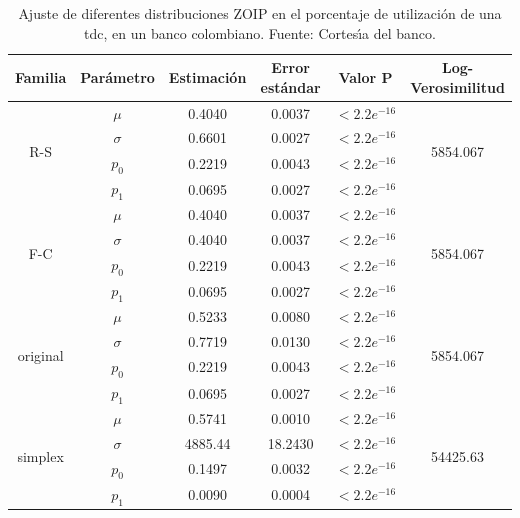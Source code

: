 \begin{table}[!hbt]
{\scriptsize
\begin{center}
\begin{tabular}{|c|c|ccc|c|}\hline
Familia & Par\'{a}metro & Estimaci\'{o}n & Error est\'{a}ndar & Valor P & Log-Verosimilitud\\ \hline

\multirow{4}{*}{R-S} &$\mu$ &0.4040	&0.0037	&$<2.2e^{-16}$ &\multirow{4}{*}{5854.067}\\
& $\sigma$ & 0.6601	&0.0027	&$<2.2e^{-16}$& \\
& $p_0$ & 0.2219	&0.0043	&$<2.2e^{-16}$ &\\
& $p_1$ & 0.0695	&0.0027	&$<2.2e^{-16}$ &\\ \hline

\multirow{4}{*}{F-C} &$\mu$ & 0.4040	&0.0037	&$<2.2e^{-16}$ &\multirow{4}{*}{5854.067}\\
& $\sigma$ & 0.4040	&0.0037	&$<2.2e^{-16}$ &\\
& $p_0$ & 0.2219	&0.0043	&$<2.2e^{-16}$ &\\
& $p_1$ & 0.0695	&0.0027	&$<2.2e^{-16}$ &\\ \hline

\multirow{4}{*}{original} &$\mu$ & 0.5233	&0.0080	&$<2.2e^{-16}$&\multirow{4}{*}{5854.067} \\
& $\sigma$ & 0.7719	&0.0130	&$<2.2e^{-16}$& \\
& $p_0$ & 0.2219	&0.0043	&$<2.2e^{-16}$& \\
& $p_1$ & 0.0695	&0.0027	&$<2.2e^{-16}$& \\ \hline

\multirow{4}{*}{simplex} &$\mu$ & 0.5741	&0.0010	&$<2.2e^{-16}$ &\multirow{4}{*}{54425.63}\\
& $\sigma$ & 4885.44	&18.2430	&$<2.2e^{-16}$ &\\
& $p_0$ & 0.1497	&0.0032	&$<2.2e^{-16}$ &\\
& $p_1$ & 0.0090	&0.0004	&$<2.2e^{-16}$ &\\ \hline

\end{tabular}
\caption{Ajuste de diferentes distribuciones ZOIP en el porcentaje de utilizaci\'{o}n de una tdc, en un banco colombiano. Fuente: Cortes\'{\i}a del banco.}
\label{T_Apli_SC}
\end{center}
}
\end{table}



